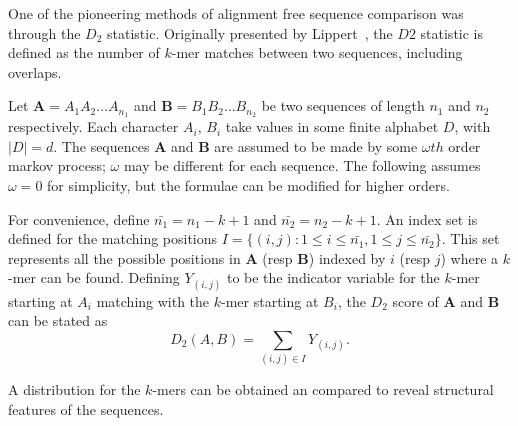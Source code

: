 




One of the pioneering methods of alignment free sequence comparison was through the $D_2$ statistic. Originally presented by Lippert~\cite{lippert2002distributional}, the $D2$ statistic is defined as the number of $k$-mer matches between two sequences, including overlaps.


Let $\mathbf{A} = A_1A_2\ldots A_{n_1}$ and $\mathbf{B}=B_1B_2\ldots B_{n_2}$ be two sequences of length $n_1$ and $n_2$ respectively. Each character $A_i,\,B_i$ take values in some finite alphabet $D$, with $|D| = d$.  The sequences $\mathbf{A}$ and $\mathbf{B}$ are assumed to be made by some $\omega th$ order markov process; $\omega$ may be different for each sequence. The following assumes $\omega = 0$ for simplicity, but the formulae can be modified for higher orders. 

For convenience, define $\bar{n_1} = n_1 - k + 1$ and $\bar{n_2} = n_2 - k + 1$. An index set is defined for the matching positions $I = \{(i,j): 1 \leq i \leq \bar{n_1}, 1 \leq j \leq \bar{n_2}\}$. This set represents all the possible positions in $\mathbf{A}$ (resp $\mathbf{B}$) indexed by $i$ (resp $j$) where a $k$-mer can be found. 
Defining $Y_{(i,j)}$ to be the indicator variable for the $k$-mer starting at $A_i$ matching with the $k$-mer starting at $B_i$, the $D_2$ score of $\mathbf{A}$ and $\mathbf{B}$ can be stated as 
	\begin{equation}
		D_2(A,B) = \sum_{(i,j)\in I }Y_{(i,j)}.\label{eqn:AF}
	\end{equation}

A distribution for the $k$-mers can be obtained an compared to reveal structural features of the sequences. 

